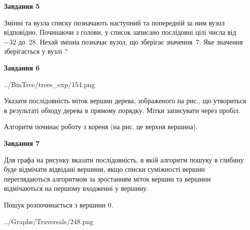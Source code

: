 \documentclass[12pt, ukrainian]{article}
\begin{document}
{\begin {large}
{\begin {center}\textbf{Завдання 5}\end {center}}\par
Змінні  та  вузла списку позначають наступний та попередній за ним вузол відповідно. Починаючи з голови, у список записано послідовні цілі числа від~$-32$ до~$28$. Нехай змінна  позначає вузол, що зберігає значення~$7$.
Яке значення зберігається у вузлі  ?\par
\newpage

{\begin {center}\textbf{Завдання 6}\end {center}}\par

\begin{center}
	{../BinTree/trees_exp/154.png}
\end{center}
Указати послідовність міток вершин дерева, зображеного на рис., що утвориться в результаті обходу дерева в прямому порядку. Мітки записувати через пробіл.\par Алгоритм починає роботу з кореня (на рис. це верхня вершина).\par
\newpage

{\begin {center}\textbf{Завдання 7}\end {center}}\par
Для графа на рисунку вказати послідовність, в якій алгоритм пошуку в глибину буде відмічати відвідані вершини, якщо списки суміжності вершин переглядаються алгоритмом за зростанням міток вершин та вершини відмічаються на першому вход\-женні у вершину.\par
Пошук розпочинається з вершини 0.\par

\begin{center}
	{../Graphs/Traversals/248.png}
\end{center}\par
\newpage


\end{large}}
\end{document}
